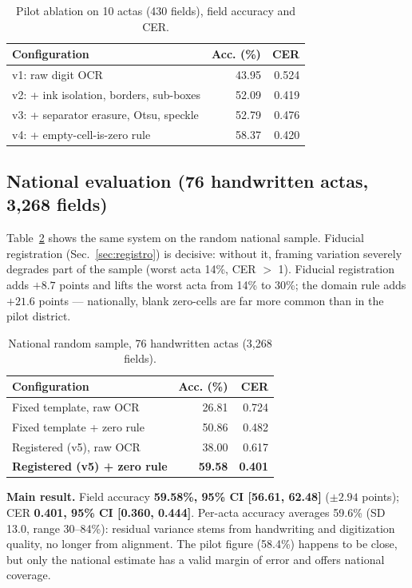 \documentclass[conference]{IEEEtran}
\begin{document}
\begin{table}[t]
\caption{Pilot ablation on 10 actas (430 fields), field accuracy and CER.}
\label{tab:pilot}
\centering
\begin{tabular}{lrr}
\toprule
Configuration & Acc. (\%) & CER \\
\midrule
v1: raw digit OCR & 43.95 & 0.524 \\
v2: + ink isolation, borders, sub-boxes & 52.09 & 0.419 \\
v3: + separator erasure, Otsu, speckle & 52.79 & 0.476 \\
v4: + empty-cell-is-zero rule & 58.37 & 0.420 \\
\bottomrule
\end{tabular}
\end{table}

\subsection{National evaluation (76 handwritten actas, 3,268 fields)}
Table~\ref{tab:national} shows the same system on the random national sample.
Fiducial registration (Sec.~\ref{sec:registro}) is decisive: without it,
framing variation severely degrades part of the sample (worst acta 14\%,
CER $>$ 1). Fiducial registration adds $+8.7$ points and lifts the
worst acta from 14\% to 30\%; the domain rule adds $+21.6$ points ---
nationally, blank zero-cells are far more common than in the pilot district.

\begin{table}[t]
\caption{National random sample, 76 handwritten actas (3,268 fields).}
\label{tab:national}
\centering
\begin{tabular}{lrr}
\toprule
Configuration & Acc. (\%) & CER \\
\midrule
Fixed template, raw OCR & 26.81 & 0.724 \\
Fixed template + zero rule & 50.86 & 0.482 \\
Registered (v5), raw OCR & 38.00 & 0.617 \\
\textbf{Registered (v5) + zero rule} & \textbf{59.58} & \textbf{0.401} \\
\bottomrule
\end{tabular}
\end{table}

\textbf{Main result.} Field accuracy \textbf{59.58\%, 95\% CI [56.61, 62.48]}
($\pm 2.94$ points); CER \textbf{0.401, 95\% CI [0.360, 0.444]}. Per-acta
accuracy averages 59.6\% (SD 13.0, range 30--84\%): residual variance stems
from handwriting and digitization quality, no longer from alignment. The
pilot figure (58.4\%) happens to be close, but only the national estimate
has a valid margin of error and offers national coverage.
\end{document}

